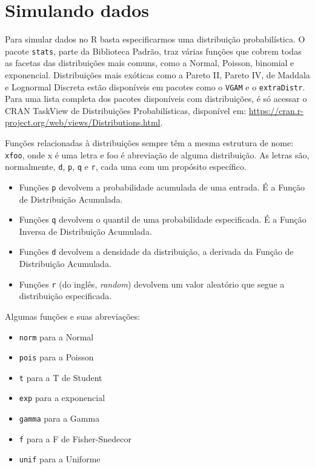\documentclass[
]{article}
\providecommand{\tightlist}{%
  \setlength{\itemsep}{0pt}\setlength{\parskip}{0pt}}
\begin{document}
\hypertarget{simulando-dados}{%
\section{Simulando dados}\label{simulando-dados}}

Para simular dados no R basta especificarmos uma distribuição
probabilística. O pacote \texttt{stats}, parte da Biblioteca Padrão,
traz várias funções que cobrem todas as facetas das distribuições mais
comuns, como a Normal, Poisson, binomial e exponencial. Distribuições
mais exóticas como a Pareto II, Pareto IV, de Maddala e Lognormal
Discreta estão disponíveis em pacotes como o \texttt{VGAM} e o
\texttt{extraDistr}. Para uma lista completa dos pacotes disponíveis com
distribuições, é só acessar o CRAN TaskView de Distribuições
Probabilísticas, disponível em:
\url{https://cran.r-project.org/web/views/Distributions.html}.

Funções relacionadas à distribuições sempre têm a mesma estrutura de
nome: \texttt{xfoo}, onde x é uma letra e foo é abreviação de alguma
distribuição. As letras são, normalmente, \texttt{d}, \texttt{p},
\texttt{q} e \texttt{r}, cada uma com um propósito específico.

\begin{itemize}
\tightlist
\item
  Funções \texttt{p} devolvem a probabilidade acumulada de uma entrada.
  É a Função de Distribuição Acumulada.
\item
  Funções \texttt{q} devolvem o quantil de uma probabilidade
  especificada. É a Função Inversa de Distribuição Acumulada.
\item
  Funções \texttt{d} devolvem a densidade da distribuição, a derivada da
  Função de Distribuição Acumulada.
\item
  Funções \texttt{r} (do inglês, \emph{random}) devolvem um valor
  aleatório que segue a distribuição especificada.
\end{itemize}

Algumas funções e suas abreviações:

\begin{itemize}
\tightlist
\item
  \texttt{norm} para a Normal
\item
  \texttt{pois} para a Poisson
\item
  \texttt{t} para a T de Student
\item
  \texttt{exp} para a exponencial
\item
  \texttt{gamma} para a Gamma
\item
  \texttt{f} para a F de Fisher-Snedecor
\item
  \texttt{unif} para a Uniforme
\end{itemize}
\end{document}
